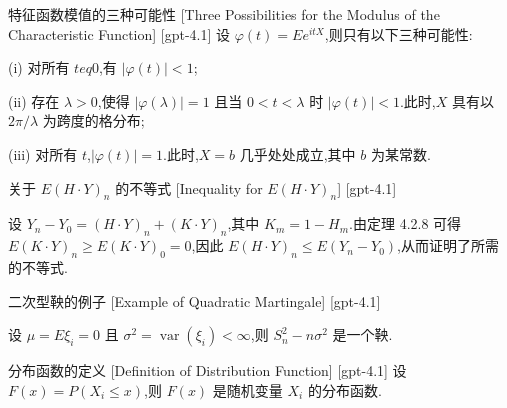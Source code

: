 \documentclass[UTF8]{ctexart}
\begin{document}
    \begin{thm}
        {特征函数模值的三种可能性}
        [Three Possibilities for the Modulus of the Characteristic Function]
        [gpt-4.1]
        设 $\varphi(t) = E e^{i t X}$,则只有以下三种可能性:

(i) 对所有 $t 
eq 0$,有 $|\varphi(t)| < 1$;

(ii) 存在 $\lambda > 0$,使得 $|\varphi(\lambda)| = 1$ 且当 $0 < t < \lambda$ 时 $|\varphi(t)| < 1$.此时,$X$ 具有以 $2\pi/\lambda$ 为跨度的格分布;

(iii) 对所有 $t$,$|\varphi(t)| = 1$.此时,$X = b$ 几乎处处成立,其中 $b$ 为某常数.

    \end{thm}
    
    
    
    \begin{thm}
        {关于 $E ( H \cdot Y )_n$ 的不等式}
        [Inequality for $E ( H \cdot Y )_n$]
        [gpt-4.1]
        
设 $Y_n - Y_0 = ( H \cdot Y )_n + ( K \cdot Y )_n$,其中 $K_m = 1 - H_m$.由定理 4.2.8 可得 $E ( K \cdot Y )_n \geq E ( K \cdot Y )_0 = 0$,因此 $E ( H \cdot Y )_n \leq E ( Y_n - Y_0 )$,从而证明了所需的不等式.

    \end{thm}
    
    
    
    \begin{xmp}
        {二次型鞅的例子}
        [Example of Quadratic Martingale]
        [gpt-4.1]
        
设 $\mu = E \xi_{i} = 0$ 且 $\sigma^{2} = \operatorname{var}(\xi_{i}) < \infty$,则 $S_{n}^{2} - n \sigma^{2}$ 是一个鞅.

    \end{xmp}
    
    
    
    \begin{dfn}
        {分布函数的定义}
        [Definition of Distribution Function]
        [gpt-4.1]
        设 $F(x) = P(X_{i} \leq x)$,则 $F(x)$ 是随机变量 $X_{i}$ 的分布函数.
    \end{dfn}
    
    
    
\end{document}
